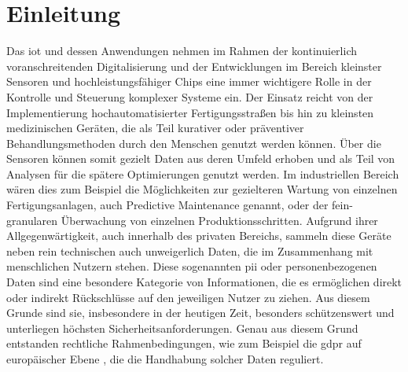 
\section{Einleitung}
\label{sec:Einleitung}



Das \ac{iot} und dessen Anwendungen nehmen im Rahmen der kontinuierlich voranschreitenden Digitalisierung und der Entwicklungen im Bereich kleinster Sensoren und hochleistungsfähiger Chips eine immer wichtigere Rolle in der Kontrolle und Steuerung komplexer Systeme ein.
Der Einsatz reicht von der Implementierung hochautomatisierter Fertigungsstraßen bis hin zu kleinsten medizinischen Geräten, die als Teil kurativer oder präventiver Behandlungsmethoden durch den Menschen genutzt werden können. Über die Sensoren können somit gezielt Daten aus deren Umfeld erhoben und als Teil von Analysen für die spätere Optimierungen genutzt werden. Im industriellen Bereich wären dies zum Beispiel die Möglichkeiten zur gezielteren Wartung von einzelnen Fertigungsanlagen, auch Predictive Maintenance genannt, oder der fein-granularen Überwachung von einzelnen Produktionsschritten.
Aufgrund ihrer Allgegenwärtigkeit, auch innerhalb des privaten Bereichs, sammeln diese Geräte neben rein technischen auch unweigerlich Daten, die im Zusammenhang mit menschlichen Nutzern stehen. Diese sogenannten \ac{pii} oder personenbezogenen Daten sind eine besondere Kategorie von Informationen, die es ermöglichen direkt oder indirekt Rückschlüsse auf den jeweiligen Nutzer zu ziehen. Aus diesem Grunde sind sie, insbesondere in der heutigen Zeit, besonders schützenswert und unterliegen höchsten Sicherheitsanforderungen.
Genau aus diesem Grund entstanden rechtliche Rahmenbedingungen, wie zum Beispiel die \ac{gdpr} auf europäischer Ebene \cite{dsgvo2016}, die die Handhabung solcher Daten reguliert.

